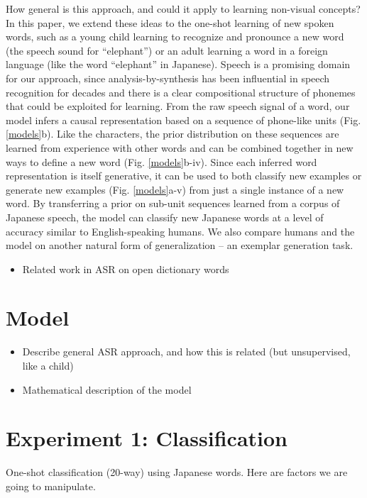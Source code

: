\documentclass[10pt,letterpaper]{article}
\begin{document}
How general is this approach, and could it apply to learning non-visual concepts? In this paper, we extend these ideas to the one-shot learning of new spoken words, such as a young child learning to recognize and pronounce a new word (the speech sound for ``elephant'') or an adult learning a word in a foreign language (like the word ``elephant'' in Japanese). Speech is a promising domain for our approach, since analysis-by-synthesis has been influential in speech recognition for decades \cite{Halle1962,Liberman1967} and there is a clear compositional structure of phonemes that could be exploited for learning. From the raw speech signal of a word, our model infers a causal representation based on a sequence of phone-like units (Fig. \ref{models}b). Like the characters, the prior distribution on these sequences are learned from experience with other words and can be combined together in new ways to define a new word (Fig. \ref{models}b-iv). Since each inferred word representation is itself generative, it can be used to both classify new examples or generate new examples (Fig. \ref{models}a-v) from just a single instance of a new word. By transferring a prior on sub-unit sequences learned from a corpus of Japanese speech, the model can classify new Japanese words at a level of accuracy similar to English-speaking humans. We also compare humans and the model on another natural form of generalization -- an exemplar generation task.

\begin{itemize}
	\item Related work in ASR on open dictionary words
\end{itemize}

\section{Model}

\begin{itemize}
\item Describe general ASR approach, and how this is related (but unsupervised, like a child)
\item Mathematical description of the model
\end{itemize}

\section{Experiment 1: Classification}

One-shot classification (20-way) using Japanese words. Here are factors we are going to manipulate.
\end{document}
